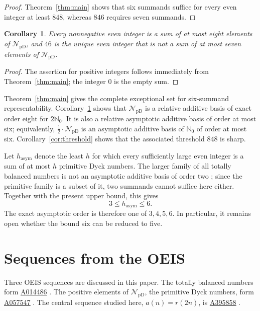\documentclass[12pt]{article}
\theoremstyle{plain}
\newtheorem{corollary}[theorem]{Corollary}
\newcommand{\NpD}{\mathcal{N}_{\mathrm{pD}}}
\newcommand{\seqnum}[1]{\href{https://oeis.org/#1}{\rm \underline{#1}}}
\begin{document}
\begin{proof}
Theorem~\ref{thm:main} shows that six summands suffice for every even
integer at least $848$, whereas $846$ requires seven summands.
\end{proof}

\begin{corollary}\label{cor:eight}
Every nonnegative even integer is a sum of at most eight elements of
$\NpD$, and $46$ is the unique even integer that is not a sum of at most
seven elements of $\NpD$.
\end{corollary}

\begin{proof}
The assertion for positive integers follows immediately from
Theorem~\ref{thm:main}; the integer $0$ is the empty sum.
\end{proof}

Theorem~\ref{thm:main} gives the complete exceptional set for
six-summand representability.  Corollary~\ref{cor:eight} shows that
$\NpD$ is a relative additive basis of exact order eight for
$2\mathbb N_0$.  It is also a relative asymptotic additive basis of
order at most six; equivalently, $\frac12\cdot\NpD$ is an asymptotic additive
basis of $\mathbb N_0$ of order at most six.  Corollary~\ref{cor:threshold}
shows that the associated threshold $848$ is sharp.

Let $h_{\mathrm{asym}}$ denote the least $h$ for which every sufficiently
large even integer is a sum of at most $h$ primitive Dyck numbers.  The
larger family of all totally balanced numbers is not an asymptotic
additive basis of order two \cite[Thm.~14]{BLS}; since the primitive
family is a subset of it, two summands cannot suffice here either.
Together with the present upper bound, this gives
\[
        3\leq h_{\mathrm{asym}}\leq6.
\]
The exact asymptotic order is therefore one of $3,4,5,6$.  In particular,
it remains open whether the bound six can be reduced to five.


\section{Sequences from the OEIS}\label{sec:oeis}

Three OEIS sequences are discussed in this paper.  The totally balanced
numbers form \seqnum{A014486} \cite{OEIS-A014486}.  The positive
elements of $\NpD$, the primitive Dyck numbers, form \seqnum{A057547}
\cite{OEIS-A057547}.  The central sequence studied here,
$a(n)=r(2n)$, is \seqnum{A395858} \cite{OEIS-A395858}.
\end{document}

